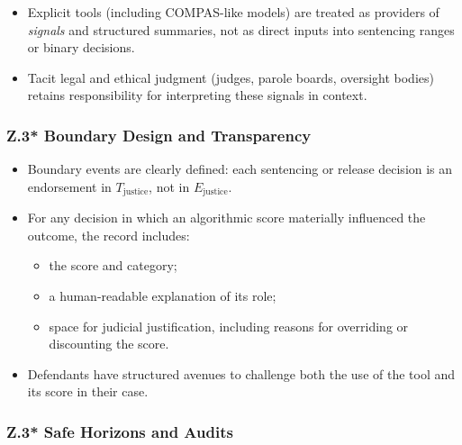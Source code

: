 \begin{itemize}
  \item Explicit tools (including COMPAS-like models) are treated as providers
        of \emph{signals} and structured summaries, not as direct inputs into
        sentencing ranges or binary decisions.
  \item Tacit legal and ethical judgment (judges, parole boards, oversight
        bodies) retains responsibility for interpreting these signals in
        context.
\end{itemize}

\subsubsection*{Z.3* Boundary Design and Transparency}

\begin{itemize}
  \item Boundary events are clearly defined: each sentencing or release
        decision is an endorsement in \(T_{\mathrm{justice}}\), not in
        \(E_{\mathrm{justice}}\).
  \item For any decision in which an algorithmic score materially influenced
        the outcome, the record includes:
        \begin{itemize}
          \item the score and category;
          \item a human-readable explanation of its role;
          \item space for judicial justification, including reasons for
                overriding or discounting the score.
        \end{itemize}
  \item Defendants have structured avenues to challenge both the use of the
        tool and its score in their case.
\end{itemize}

\subsubsection*{Z.3* Safe Horizons and Audits}

